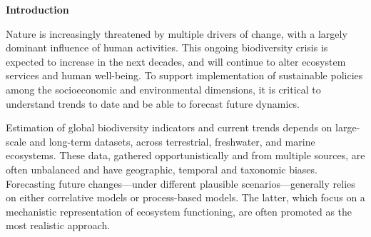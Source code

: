 \documentclass[11pt]{article}
\begin{document}
\textbf{Introduction}

Nature is increasingly threatened by multiple drivers of change, with a largely dominant influence of human activities. This ongoing biodiversity crisis is expected to increase in the next decades, and will continue to alter ecosystem services and human well-being. To support implementation of sustainable policies among the socioeconomic and environmental dimensions, it is critical to understand trends to date and be able to forecast future dynamics. 


Estimation of global biodiversity indicators and current trends depends on large-scale and long-term datasets, across terrestrial, freshwater, and marine ecosystems. These data, gathered opportunistically and from multiple sources, are often unbalanced and have geographic, temporal and taxonomic biases.
Forecasting future changes---under different plausible scenarios---generally relies on either correlative models or process-based models. The latter, which focus on a mechanistic representation of ecosystem functioning, are often promoted as the most realistic approach.
\end{document}
